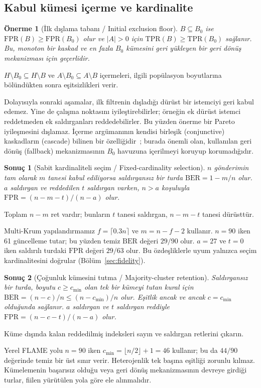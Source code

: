 \documentclass[journal]{IEEEtran}
\newtheorem{proposition}{Önerme}
\newtheorem{corollary}{Sonuç}
\newcommand{\BER}{\mathrm{BER}}
\begin{document}
\subsection{Kabul kümesi içerme ve kardinalite}
\begin{proposition}[İlk dışlama tabanı / Initial exclusion floor]\label{prop:floor}
$B\subseteq B_0$ ise $\mathrm{FPR}(B)\geq\mathrm{FPR}(B_0)$ olur ve $|A|>0$ için $\mathrm{TPR}(B)\geq\mathrm{TPR}(B_0)$ sağlanır. Bu, monoton bir kaskad ve en fazla $B_0$ kümesini geri yükleyen bir geri dönüş mekanizması için geçerlidir.
\end{proposition}
\begin{IEEEproof}
$H\setminus B_0\subseteq H\setminus B$ ve $A\setminus B_0\subseteq A\setminus B$ içermeleri, ilgili popülasyon boyutlarına bölündükten sonra eşitsizlikleri verir.
\end{IEEEproof}
Dolayısıyla sonraki aşamalar, ilk filtrenin dışladığı dürüst bir istemciyi geri kabul edemez. Yine de çalışma noktasını iyileştirebilirler; örneğin ek dürüst istemci reddetmeden ek saldırganları reddedebilirler. Bu yüzden önerme bir Pareto iyileşmesini dışlamaz. İçerme argümanının kendisi birleşik (conjunctive) kaskadların (cascade) bilinen bir özelliğidir~\cite{viola2004cascade}; burada önemli olan, kullanılan geri dönüş (fallback) mekanizmasının $B_0$ havuzuna içerilmeyi koruyup korumadığıdır.

\begin{corollary}[Sabit kardinaliteli seçim / Fixed-cardinality selection]\label{cor:cardinality}
$n$ gönderimin tam olarak $m$ tanesi kabul ediliyorsa saldırgansız bir turda $\BER=1-m/n$ olur. $a$ saldırgan ve reddedilen $t$ saldırgan varken, $n>a$ koşuluyla $\mathrm{FPR}=(n-m-t)/(n-a)$ olur.
\end{corollary}
\begin{IEEEproof}
Toplam $n-m$ ret vardır; bunların $t$ tanesi saldırgan, $n-m-t$ tanesi dürüsttür.
\end{IEEEproof}
Multi-Krum yapılandırmamız $f=\lceil0.3n\rceil$ ve $m=n-f-2$ kullanır. $n=90$ iken 61 güncelleme tutar; bu yüzden temiz $\BER$ değeri $29/90$ olur. $a=27$ ve $t=0$ iken saldırılı turdaki $\mathrm{FPR}$ değeri $29/63$ olur. Bu özdeşliklerle uyum yalnızca seçim kardinalitesini doğrular (Bölüm~\ref{sec:fidelity}).

\begin{corollary}[Çoğunluk kümesini tutma / Majority-cluster retention]\label{cor:majority}
Saldırgansız bir turda, boyutu $c\geq c_{\min}$ olan tek bir kümeyi tutan kural için $\BER=(n-c)/n\leq(n-c_{\min})/n$ olur. Eşitlik ancak ve ancak $c=c_{\min}$ olduğunda sağlanır. $a$ saldırgan ve $t$ saldırgan reddiyle $\mathrm{FPR}=(n-c-t)/(n-a)$ olur.
\end{corollary}
\begin{IEEEproof}
Küme dışında kalan reddedilmiş indeksleri sayın ve saldırgan retlerini çıkarın.
\end{IEEEproof}
Yerel FLAME yolu $n=90$ iken $c_{\min}=\lfloor n/2\rfloor+1=46$ kullanır; bu da $44/90$ değerinde temiz bir üst sınır verir. Heterojenlik tek başına eşitliği zorunlu kılmaz. Kümelemenin başarısız olduğu veya geri dönüş mekanizmasının devreye girdiği turlar, fiilen yürütülen yola göre ele alınmalıdır.
\end{document}
